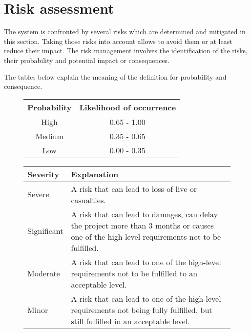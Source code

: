 \newpage
\section{Risk assessment}
\label{sec:risk-assesment}
The system is confronted by several risks which are determined and mitigated in this section.
Taking those risks into account allows to avoid them or at least reduce their impact. 
The risk management involves the identification of the risks, their probability and potential impact or consequences.

The tables below explain the meaning of the definition for probability and consequence.
\begin{figure}[H]
	\centering
	\begin{tabular}{|c|c|}
		\hline \textbf{Probability} & \textbf{Likelihood of occurrence} \\ 
		\hline High                 & 0.65 - 1.00                       \\ 
		\hline Medium               & 0.35 - 0.65                       \\ 
		\hline Low                  & 0.00 - 0.35                       \\ 
		\hline
	\end{tabular} 
	\label{table:risk-probability}
\end{figure}

\begin{figure}[H]
	\centering
	\begin{tabular}{|l|p{15.5cm}|}
		\hline \textbf{Severity} & \textbf{Explanation}                                                                                                                        \\ 
		\hline Severe            & A risk that can lead to loss of live or casualties.                                                                                         \\ 
		\hline Significant       & A risk that can lead to damages, can delay the project more than 3 months or causes one of the high-level requirements not to be fulfilled. \\ 
		\hline Moderate          & A risk that can lead to one of the high-level requirements not to be fulfilled to an acceptable level.                                      \\ 
		\hline Minor             & A risk that can lead to one of the high-level requirements not being fully fulfilled, but still fulfilled in an acceptable level.           \\
		\hline
	\end{tabular} 
	\label{table:risk-severity}
\end{figure}

